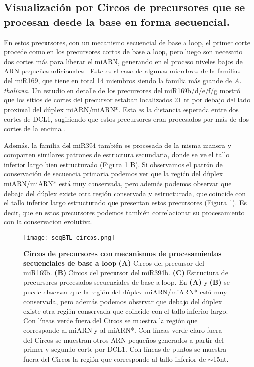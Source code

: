 \subsection{Visualización por Circos de precursores que se procesan desde la base en forma secuencial.}

En estos precursores, con un mecanismo secuencial de base a loop, el primer corte procede como en los precursores cortos de base a loop, pero luego son necesario dos cortes más para liberar el miARN, generando en el proceso niveles bajos de ARN pequeños adicionales \citep{Bologna2013}.
Este es el caso de algunos miembros de la  familias del miR169, que tiene en total 14 miembros siendo la familia más grande de \textit{A. thaliana}.
Un estudio en detalle de los precursores del miR169b/d/e/f/g mostró que los sitios de cortes del precursor estaban localizados 21 nt por debajo del lado proximal del dúplex miARN/miARN*.
Esta es la distancia esperada entre dos cortes de DCL1, sugiriendo que estos precursores eran procesados por más de dos cortes de la encima \citep{Bologna2013}.

Además. la familia del miR394 también es procesada de la misma manera y comparten similares patrones de estructura secundaria, donde se ve el tallo inferior largo bien estructurado (Figura \ref{fig:seqBTL_circos} B).
Si observamos el patrón de conservación de secuencia primaria podemos ver que la región del dúplex miARN/miARN* está muy conservada, pero además podemos observar que debajo del dúplex existe otra región conservada y estructurada, que coincide con el tallo inferior largo estructurado que presentan estos precursores (Figura \ref{fig:seqBTL_circos}).
Es decir, que en estos precursores podemos también correlacionar su procesamiento con la conservación evolutiva.

\begin{landscape}
    \begin{figure}[htbp!] 
        \centering    
        \texttt{[image: seqBTL\_circos.png]}
        \caption[Circos de precursores con mecanismos de procesamientos secuenciales de base a loop]{
        \textbf{Circos de precursores con mecanismos de procesamientos secuenciales de base a loop}
		 \textbf{(A)} Circos del precursor del miR169b.
		 \textbf{(B)} Circos del precursor del miR394b.
		 \textbf{(C)} Estructura de precursores procesados secuenciales de base a loop.
		 En \textbf{(A)} y \textbf{(B)} se puede observar que la región del dúplex miARN/miARN* está muy conservada, pero además podemos observar que debajo del dúplex existe otra región conservada que coincide con el tallo inferior largo.
        Con líneas verde fuera del Circos se muestra la región que corresponde al miARN y al miARN*. 
        Con líneas verde claro fuera del Circos se muestran otros ARN pequeños  generados a partir del primer y segundo corte por DCL1.
        Con líneas de puntos se muestra fuera del Circos la región que corresponde al tallo inferior de $\sim$15nt.
		}
         \label{fig:seqBTL_circos}
    \end{figure}
\end{landscape}


